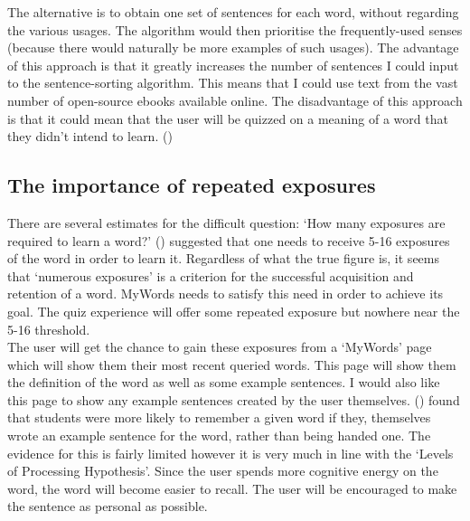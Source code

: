 The alternative is to obtain one set of sentences for each word, without regarding the various usages. The algorithm would then prioritise the frequently-used senses (because there would naturally be more examples of such usages). The advantage of this approach is that it greatly increases the number of sentences I could input to the sentence-sorting algorithm. This means that I could use text from the vast number of open-source ebooks available online. The disadvantage of this approach is that it could mean that the user will be quizzed on a meaning of a word that they didn’t intend to learn. (\cite{baicheng2009})

\subsection{The importance of repeated exposures}

There are several estimates for the difficult question: `How many exposures are required to learn a word?’
(\cite{Nation1990}) suggested that one needs to receive 5-16 exposures of the word in order to learn it. Regardless of what the true figure is, it seems that `numerous exposures’ is a criterion for the successful acquisition and retention of a word. MyWords needs to satisfy this need in order to achieve its goal. The quiz experience will offer some repeated exposure but nowhere near the 5-16 threshold.\\

The user will get the chance to gain these exposures from a `MyWords’ page which will show them their most recent queried words. This page will show them the definition of the word as well as some example sentences. I would also like this page to show any example sentences created by the user themselves. (\cite{baicheng2009}) found that students were more likely to remember a given word if they,  themselves wrote an example sentence for the word, rather than being handed one. The evidence for this is fairly limited however it is very much in line with the `Levels of Processing Hypothesis’. Since the user spends more cognitive energy on the word, the word will become easier to recall. The user will be encouraged to make the sentence as personal as possible.  







